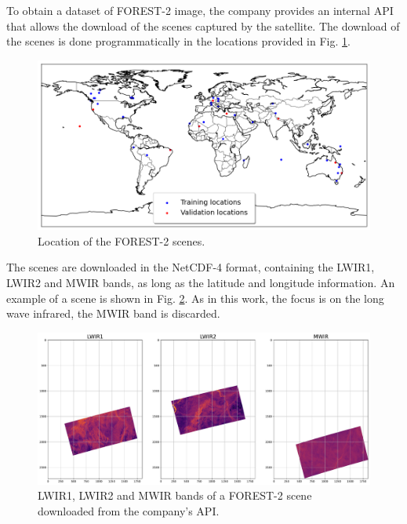     To obtain a dataset of FOREST-2 image, the company provides an internal API that allows the download of the scenes captured by the satellite. 
    The download of the scenes is done programmatically in the locations provided in Fig. \ref{fig:4-forest-locations}. 

    \begin{figure}[H]
        \centering
        \includegraphics[width=\linewidth]{Includes/4-forest-locations.png}
        \caption{Location of the FOREST-2 scenes.}
        \label{fig:4-forest-locations}
    \end{figure}

    The scenes are downloaded in the NetCDF-4 format, containing the LWIR1, LWIR2 and MWIR bands, as long as the latitude and longitude information. 
    An example of a scene is shown in Fig. \ref{fig:4-forest-complete example}. 
    As in this work, the focus is on the long wave infrared, the MWIR band is discarded.

    \begin{figure}[H]
        \centering
        \includegraphics[width=\linewidth]{Includes/4-forest2-unprocessed-bands.pdf}
        \caption{LWIR1, LWIR2 and MWIR bands of a FOREST-2 scene downloaded from the company's API.}
        \label{fig:4-forest-complete example}
    \end{figure}

